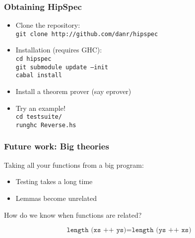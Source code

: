 \documentclass[serif,professionalfont]{beamer}
\newcommand\hs[1]{\texttt{#1}}
\begin{document}
\begin{frame}[fragile]
  \frametitle{Obtaining HipSpec}

  \begin{itemize}

    \item Clone the repository:
      \\ \hs{git clone http://github.com/danr/hipspec}

    \item Installation (requires GHC):
       \\ \hs{cd hipspec}
       \\ \hs{git submodule update --init}
       \\ \hs{cabal install}

    \item Install a theorem prover (say eprover)

    \item Try an example!
       \\ \hs{cd testsuite/}
       \\ \hs{runghc Reverse.hs}

  \end{itemize}


\end{frame}
\begin{frame}[fragile]

  \frametitle{Future work: Big theories}

  Taking all your functions from a big program:

  \begin{itemize}
    \item Testing takes a long time
    \item Lemmas become unrelated
  \end{itemize}

  \pause

  \vspace{\baselineskip}

  How do we know when functions are related?

  \begin{equation*}
    \hs{length (xs ++ ys)} = \hs{length (ys ++ xs)}
  \end{equation*}

\end{frame}
\end{document}
